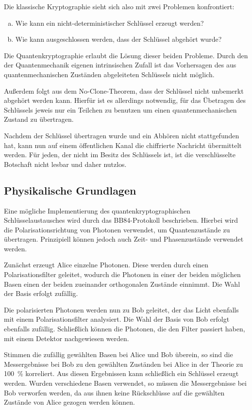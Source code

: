 Die klassische Kryptographie sieht sich also mit zwei Problemen konfrontiert:
\begin{enumerate}[a)]
 \item Wie kann ein nicht-deterministischer Schlüssel erzeugt werden?
 \item Wie kann ausgeschlossen werden, dass der Schlüssel abgehört wurde?
\end{enumerate}

Die Quantenkryptographie erlaubt die Lösung dieser beiden Probleme. Durch
den der Quantenmechanik eigenen intrinsischen Zufall ist das Vorhersagen
des aus quantenmechanischen Zuständen abgeleiteten Schlüssels nicht möglich.

Außerdem folgt aus dem No-Clone-Theorem, dass der Schlüssel nicht unbemerkt
abgehört werden kann. Hierfür ist es allerdings notwendig, für das Übetragen des
Schlüssels jeweis nur ein Teilchen zu benutzen um einen quantenmechanischen
Zustand zu übertragen.

Nachdem der Schlüssel übertragen wurde und ein Abhören nicht stattgefunden hat,
kann nun auf einem öffentlichen Kanal die chiffrierte Nachricht übermittelt werden.
Für jeden, der nicht im Besitz des Schlüssels ist, ist die verschlüsselte
Botschaft nicht lesbar und daher nutzlos.

\subsection{Physikalische Grundlagen}

Eine mögliche Implementierung des quantenkryptographischen Schlüsselaustausches
wird durch das BB84-Protokoll beschrieben. Hierbei wird die
Polarisationsrichtung von Photonen verwendet, um Quantenzustände zu übertragen.
Prinzipiell können jedoch auch Zeit- und Phasenzustände verwendet werden.

Zunächst erzeugt Alice einzelne Photonen. Diese werden durch
einen Polarisationsfilter geleitet, wodurch die Photonen in einer der beiden
möglichen Basen einen der beiden zueinander orthogonalen Zustände einnimmt.
Die Wahl der Basis erfolgt zufällig.

Die polarisierten Photonen werden nun zu Bob geleitet, der das Licht ebenfalls
mit einem Polarisationsfilter analysiert. Die Wahl der Basis von Bob erfolgt
ebenfalls zufällig. Schließlich können die Photonen, die den Filter passiert
haben, mit einem Detektor nachgewiesen werden.

Stimmen die zufällig gewählten Basen bei Alice und Bob überein, so sind die
Messergebnisse bei Bob zu den gewählten Zuständen bei Alice in der Theorie zu
\SI{100}{\percent} korreliert. Aus diesen Ergebnissen kann schließlich ein
Schlüssel erzeugt werden. Wurden verschiedene Basen verwendet, so müssen die
Messergebnisse bei Bob verworfen werden, da aus ihnen keine Rückschlüsse auf die
gewählten Zustände von Alice gezogen werden können.

